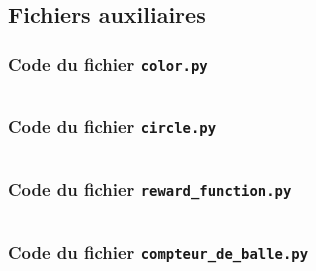 \documentclass[12pt,a4paper,fleqn]{article}
\begin{document}
\pagestyle{fancy} %





\tableofcontents
\chapter{}




\newpage
\section{Fichiers auxiliaires}

\subsection{Code du fichier \texttt{color.py}}
\inputminted{python}{../color.py}

\subsection{Code du fichier \texttt{circle.py}}
\inputminted{python}{../circle.py}

\newpage
\subsection{Code du fichier \texttt{reward_function.py}}
\inputminted[firstline=1,lastline=23]{python}{../reward_functions.py}

\subsection{Code du fichier \texttt{compteur_de_balle.py}}
\inputminted[firstline=1,lastline=57]{python}{../compteur_de_balle.py}
\end{document}
